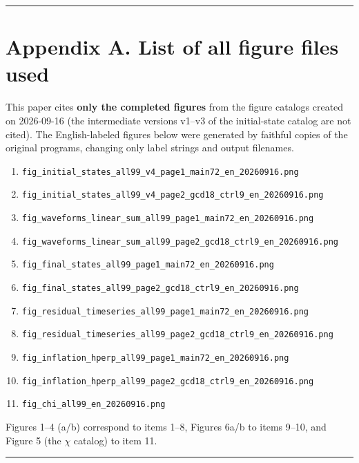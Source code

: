 \documentclass[
  a4paper,
]{article}
\providecommand{\tightlist}{%
  \setlength{\itemsep}{0pt}\setlength{\parskip}{0pt}}
\begin{document}
\begin{center}\rule{0.5\linewidth}{0.5pt}\end{center}

\section{Appendix A. List of all figure files
used}\label{appendix-a.-list-of-all-figure-files-used}

This paper cites \textbf{only the completed figures} from the figure
catalogs created on 2026-09-16 (the intermediate versions v1--v3 of the
initial-state catalog are not cited). The English-labeled figures below
were generated by faithful copies of the original programs, changing
only label strings and output filenames.

\begin{enumerate}
\def\labelenumi{\arabic{enumi}.}
\tightlist
\item
  \texttt{fig\_initial\_states\_all99\_v4\_page1\_main72\_en\_20260916.png}
\item
  \texttt{fig\_initial\_states\_all99\_v4\_page2\_gcd18\_ctrl9\_en\_20260916.png}
\item
  \texttt{fig\_waveforms\_linear\_sum\_all99\_page1\_main72\_en\_20260916.png}
\item
  \texttt{fig\_waveforms\_linear\_sum\_all99\_page2\_gcd18\_ctrl9\_en\_20260916.png}
\item
  \texttt{fig\_final\_states\_all99\_page1\_main72\_en\_20260916.png}
\item
  \texttt{fig\_final\_states\_all99\_page2\_gcd18\_ctrl9\_en\_20260916.png}
\item
  \texttt{fig\_residual\_timeseries\_all99\_page1\_main72\_en\_20260916.png}
\item
  \texttt{fig\_residual\_timeseries\_all99\_page2\_gcd18\_ctrl9\_en\_20260916.png}
\item
  \texttt{fig\_inflation\_hperp\_all99\_page1\_main72\_en\_20260916.png}
\item
  \texttt{fig\_inflation\_hperp\_all99\_page2\_gcd18\_ctrl9\_en\_20260916.png}
\item
  \texttt{fig\_chi\_all99\_en\_20260916.png}
\end{enumerate}

Figures 1--4 (a/b) correspond to items 1--8, Figures 6a/b to items
9--10, and Figure 5 (the \(\chi\) catalog) to item 11.

\begin{center}\rule{0.5\linewidth}{0.5pt}\end{center}
\end{document}
